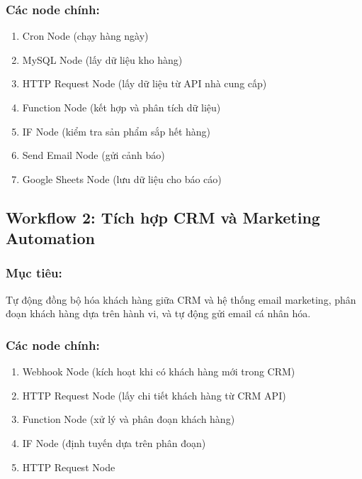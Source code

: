 \subsubsection{Các node chính:}
\begin{enumerate}
    \item Cron Node (chạy hàng ngày)
    \item MySQL Node (lấy dữ liệu kho hàng)
    \item HTTP Request Node (lấy dữ liệu từ API nhà cung cấp)
    \item Function Node (kết hợp và phân tích dữ liệu)
    \item IF Node (kiểm tra sản phẩm sắp hết hàng)
    \item Send Email Node (gửi cảnh báo)
    \item Google Sheets Node (lưu dữ liệu cho báo cáo)
\end{enumerate}

\subsection{Workflow 2: Tích hợp CRM và Marketing Automation}

\subsubsection{Mục tiêu:} Tự động đồng bộ hóa khách hàng giữa CRM và hệ thống email marketing, phân đoạn khách hàng dựa trên hành vi, và tự động gửi email cá nhân hóa.

\subsubsection{Các node chính:}
\begin{enumerate}
    \item Webhook Node (kích hoạt khi có khách hàng mới trong CRM)
    \item HTTP Request Node (lấy chi tiết khách hàng từ CRM API)
    \item Function Node (xử lý và phân đoạn khách hàng)
    \item IF Node (định tuyến dựa trên phân đoạn)
    \item HTTP Request Node 
\end{enumerate}